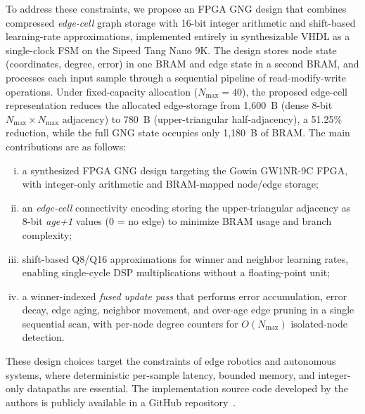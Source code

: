 \documentclass[conference]{IEEEtran}
\begin{document}
To address these constraints, we propose an FPGA GNG design that combines compressed \emph{edge-cell} graph storage with 16-bit integer arithmetic and shift-based learning-rate approximations, implemented entirely in synthesizable VHDL as a single-clock FSM on the Sipeed Tang Nano 9K. The design stores node state (coordinates, degree, error) in one BRAM and edge state in a second BRAM, and processes each input sample through a sequential pipeline of read-modify-write operations. Under fixed-capacity allocation ($N_{\max}=40$), the proposed edge-cell representation reduces the allocated edge-storage from 1,600~B (dense 8-bit $N_{\max}\!\times\!N_{\max}$ adjacency) to 780~B (upper-triangular half-adjacency), a 51.25\% reduction, while the full GNG state occupies only 1,180~B of BRAM. The main contributions are as follows:
\begin{enumerate}[(i)]
  \item a synthesized FPGA GNG design targeting the Gowin GW1NR-9C FPGA, with integer-only arithmetic and BRAM-mapped node/edge storage;
  \item an \emph{edge-cell} connectivity encoding storing the upper-triangular adjacency as 8-bit \emph{age+1} values (0 = no edge) to minimize BRAM usage and branch complexity;
  \item shift-based Q8/Q16 approximations for winner and neighbor learning rates, enabling single-cycle DSP multiplications without a floating-point unit;
  \item a winner-indexed \emph{fused update pass} that performs error accumulation, error decay, edge aging, neighbor movement, and over-age edge pruning in a single sequential scan, with per-node degree counters for $O(N_{\max})$ isolated-node detection.
\end{enumerate}

These design choices target the constraints of edge robotics and autonomous systems, where deterministic per-sample latency, bounded memory, and integer-only datapaths are essential. The implementation source code developed by the authors is publicly available in a GitHub repository~\cite{fpga_gng_repo}.


\end{document}
